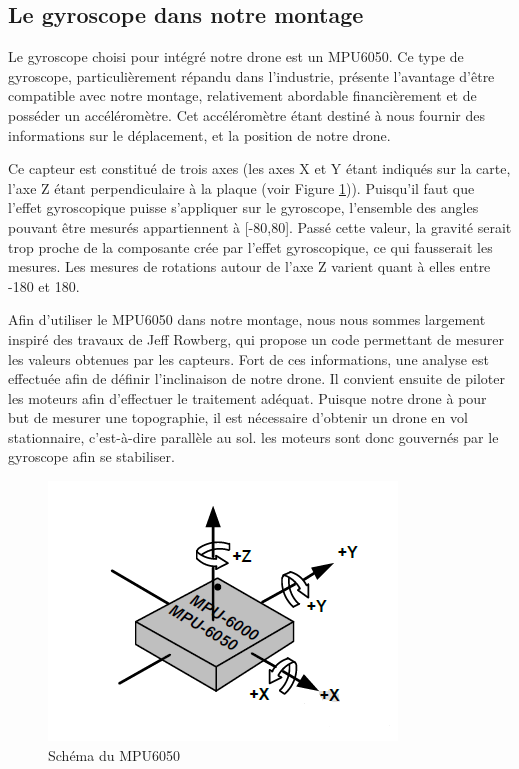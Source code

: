 \documentclass[a4paper,10pt]{report}
\begin{document}
	\subsection{Le gyroscope dans notre montage}
	  Le gyroscope choisi pour intégré notre drone est un MPU6050. Ce type 
de gyroscope, particulièrement répandu dans l'industrie, présente l'avantage 
d'être compatible avec notre montage, relativement abordable financièrement et 
de posséder un accéléromètre. Cet accéléromètre étant destiné à nous fournir 
des informations sur le déplacement, et la position de notre drone. 
 
	  Ce capteur est constitué de trois axes (les axes X et Y étant 
indiqués sur la carte, l'axe Z étant perpendiculaire à la plaque (voir 
Figure \ref{mpu6050schema})). Puisqu'il faut que l'effet gyroscopique puisse 
s'appliquer sur le gyroscope, l'ensemble des angles pouvant être mesurés 
appartiennent à [-80,80]. Passé cette valeur, la gravité serait trop proche de 
la composante crée par l'effet gyroscopique, ce qui fausserait les mesures. Les 
mesures de rotations autour de l'axe Z varient quant à elles entre -180 et 180.

	  Afin d'utiliser le MPU6050 dans notre montage, nous nous sommes 
largement inspiré des travaux de Jeff Rowberg\cite{jeffrwork}, qui propose un 
code permettant de mesurer les valeurs obtenues par les capteurs. Fort de ces 
informations, une analyse est effectuée afin de définir l'inclinaison de notre 
drone. Il convient ensuite de piloter les moteurs afin d'effectuer le 
traitement adéquat. Puisque notre drone à pour but de mesurer une topographie, 
il est nécessaire d'obtenir un drone en vol stationnaire, c'est-à-dire 
parallèle au sol. les moteurs sont donc gouvernés par le gyroscope afin se 
stabiliser.

	  \begin{figure}[htbp]
	    \centering
	    \includegraphics[scale = 0.6]{img/MPU6050_schema.png}
	    \caption{Schéma du MPU6050}
	    \label{mpu6050schema}
	  \end{figure}
	  
\end{document}
